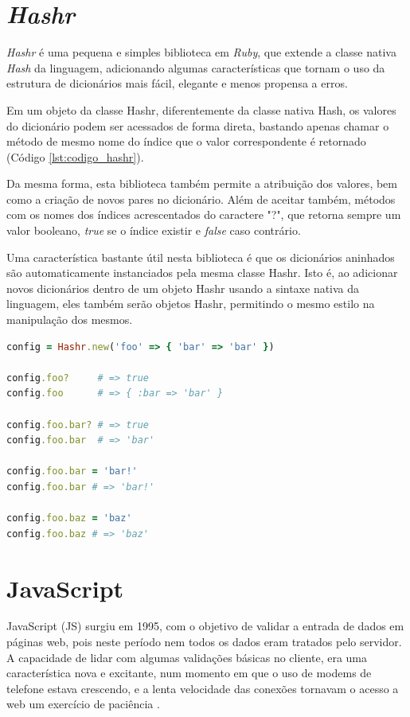 \section{\textit{Hashr}}

\textit{Hashr} \cite{HASHR} é uma pequena e simples biblioteca em \textit{Ruby}, que extende a classe nativa \textit{Hash} da linguagem, adicionando algumas características que tornam o uso da estrutura de dicionários mais fácil, elegante e menos propensa a erros.

Em um objeto da classe Hashr, diferentemente da classe nativa Hash, os valores do dicionário podem ser acessados de forma direta, bastando apenas chamar o método de mesmo nome do índice que o valor correspondente é retornado (Código \ref{lst:codigo_hashr}).

Da mesma forma, esta biblioteca também permite a atribuição dos valores, bem como a criação de novos pares no dicionário. Além de aceitar também, métodos com os nomes dos índices acrescentados do caractere "?", que retorna sempre um valor booleano, \textit{true} se o índice existir e \textit{false} caso contrário.

Uma característica bastante útil nesta biblioteca é que os dicionários aninhados são automaticamente instanciados pela mesma classe Hashr. Isto é, ao adicionar novos dicionários dentro de um objeto Hashr usando a sintaxe nativa da linguagem, eles também serão objetos Hashr, permitindo o mesmo estilo na manipulação dos mesmos.

{\singlespace
\begin{lstlisting}[caption=Exemplo do uso da classe \textit{Hashr} retirado da página do projeto, language=Ruby,label={lst:codigo_hashr}]
config = Hashr.new('foo' => { 'bar' => 'bar' })

config.foo?     # => true
config.foo      # => { :bar => 'bar' }

config.foo.bar? # => true
config.foo.bar  # => 'bar'

config.foo.bar = 'bar!'
config.foo.bar # => 'bar!'

config.foo.baz = 'baz'
config.foo.baz # => 'baz'\end{lstlisting}
}


\section{JavaScript}

JavaScript (JS) surgiu em 1995, com o objetivo de validar a entrada de dados em páginas web, pois neste período nem todos os dados eram tratados pelo servidor. A capacidade de lidar com algumas validações básicas no cliente, era uma característica nova e excitante, num momento em que o uso de modems de telefone estava crescendo, e a lenta velocidade das conexões tornavam o acesso a web um exercício de paciência \cite{ZAKAS}.

